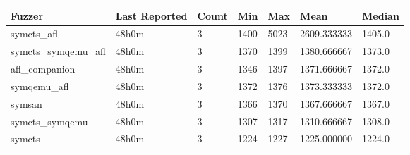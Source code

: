 
\begin{table*}[h]
\centering
\begin{tabular}{|l|l|l|l|l|l|l|}
\hline
\textbf{Fuzzer} & \textbf{Last Reported} & \textbf{Count} & \textbf{Min} & \textbf{Max} & \textbf{Mean} & \textbf{Median} \\
\hline
symcts\_afl        & 48h0m              & 3      & 1400  & 5023  & 2609.333333   & 1405.0     \\
symcts\_symqemu\_afl & 48h0m              & 3      & 1370  & 1399  & 1380.666667   & 1373.0     \\
afl\_companion     & 48h0m              & 3      & 1346  & 1397  & 1371.666667   & 1372.0     \\
symqemu\_afl       & 48h0m              & 3      & 1372  & 1376  & 1373.333333   & 1372.0     \\
symsan             & 48h0m              & 3      & 1366  & 1370  & 1367.666667   & 1367.0     \\
symcts\_symqemu    & 48h0m              & 3      & 1307  & 1317  & 1310.666667   & 1308.0     \\
symcts             & 48h0m              & 3      & 1224  & 1227  & 1225.000000   & 1224.0     \\
\hline
\end{tabular}
\end{table*}